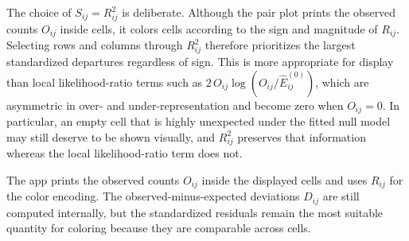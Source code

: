 \documentclass[11pt]{article}
\begin{document}
\begin{appendix}
The choice of $S_{ij} = R_{ij}^2$ is deliberate. Although the pair plot prints
the observed counts $O_{ij}$ inside cells, it colors cells according to the sign
and magnitude of $R_{ij}$. Selecting rows and columns through $R_{ij}^2$
therefore prioritizes the largest standardized departures regardless of sign.
This is more appropriate for display than local likelihood-ratio terms such as
$2\,O_{ij}\log(O_{ij}/\widehat{E}^{(0)}_{ij})$, which are asymmetric in over- and
under-representation and become zero when $O_{ij}=0$. In particular, an empty
cell that is highly unexpected under the fitted null model may still deserve to
be shown visually, and $R_{ij}^2$ preserves that information whereas the local
likelihood-ratio term does not.

The app prints the observed counts $O_{ij}$ inside the displayed
cells and uses $R_{ij}$ for the color encoding. The observed-minus-expected
deviations $D_{ij}$ are still computed internally, but the standardized
residuals remain the most suitable quantity for coloring because they are
comparable across cells.

\end{appendix}
\end{document}
